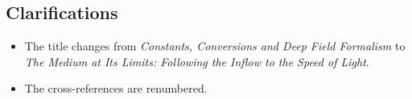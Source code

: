 \subsection*{Clarifications}
\begin{itemize}
\item The title changes from \textit{Constants, Conversions and Deep Field Formalism} to \textit{The Medium at Its Limits: Following the Inflow to the Speed of Light}.
\item The cross-references are renumbered.
\end{itemize}




